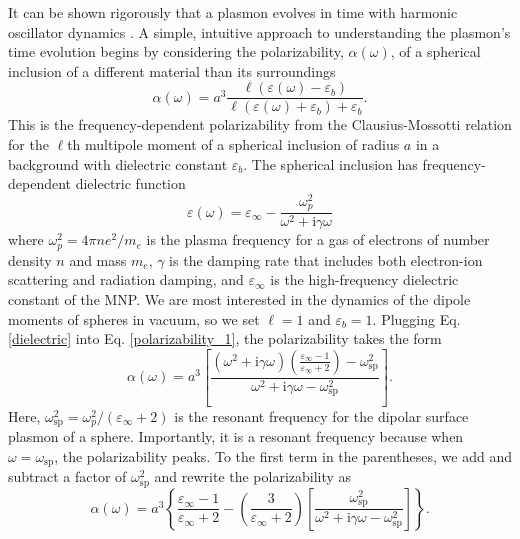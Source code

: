 \documentclass [11pt, proquest] {uwthesis}[2016/11/22]
\begin{document}
It can be shown rigorously that a plasmon evolves in time with harmonic oscillator dynamics \cite{KREIBIG1985,ARPC}. A simple, intuitive approach to understanding the plasmon's time evolution begins by considering the polarizability, $\alpha(\omega)$, of a spherical inclusion of a different material than its surroundings
\begin{equation}
\alpha(\omega) = a^3\frac{\ell(\varepsilon(\omega)-\varepsilon_b)}{\ell(\varepsilon(\omega)+\varepsilon_b)+\varepsilon_b}.
\label{polarizability_1}
\end{equation}
This is the frequency-dependent polarizability from the Clausius-Mossotti relation \cite{Clausius} for the $\ell$th multipole moment of a spherical inclusion of radius $a$ in a background with dielectric constant $\varepsilon_b$.  The spherical inclusion has frequency-dependent dielectric function 
\begin{equation}
\varepsilon(\omega) = \varepsilon_{\infty} - \frac{\omega_p^2}{\omega^2+\textrm{i}\gamma\omega}
\label{dielectric}
\end{equation}
where $\omega_p^2 = 4\pi ne^2/m_e$ is the plasma frequency for a gas of electrons of number density $n$ and mass $m_e$, $\gamma$ is the damping rate that includes both electron-ion scattering and radiation damping, and $\varepsilon_{\infty}$ is the high-frequency dielectric constant of the MNP. We are most interested in the dynamics of the dipole moments of spheres in vacuum, so we set $\ell = 1$ and $\varepsilon_b = 1$. Plugging Eq. \ref{dielectric} into Eq. \ref{polarizability_1}, the polarizability takes the form
\begin{equation}
\alpha(\omega) = a^3\left[\frac{\left(\omega^2+\textrm{i}\gamma\omega\right)\left(\frac{\varepsilon_{\infty}-1}{\varepsilon_{\infty}+2}\right)-\omega_{\textrm{sp}}^2}{\omega^2+\textrm{i}\gamma\omega-\omega_{\textrm{sp}}^2}\right].
\label{polarizability_2}
\end{equation}
Here, $\omega_{\textrm{sp}}^2 = \omega_p^2/(\varepsilon_{\infty}+2)$ is the resonant frequency for the dipolar surface plasmon of a sphere. Importantly, it is a resonant frequency because when $\omega=\omega_{\textrm{sp}}$, the polarizability peaks. To the first term in the parentheses, we add and subtract a factor of $\omega_{\textrm{sp}}^2$ and rewrite the polarizability as
\begin{equation}
\alpha(\omega) = a^3\left\{\frac{\varepsilon_{\infty}-1}{\varepsilon_{\infty}+2} -\left(\frac{3}{\varepsilon_{\infty}+2}\right)\left[\frac{\omega_{\textrm{sp}}^2}{\omega^2+\textrm{i}\gamma\omega-\omega_{\textrm{sp}}^2}\right]\right\}.
\label{polarizability_3}
\end{equation}
\end{document}
